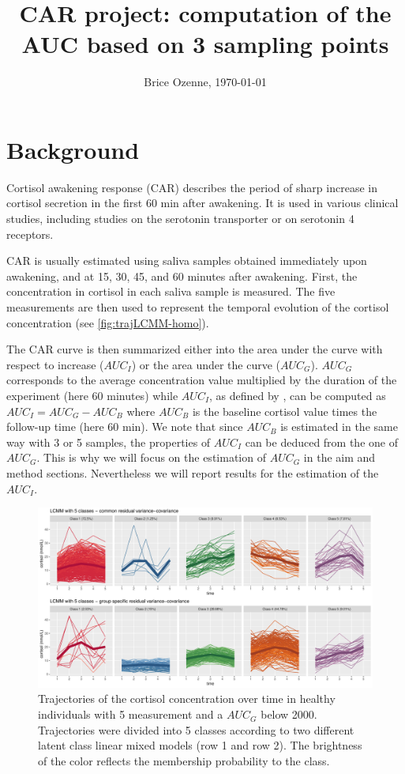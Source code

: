 \documentclass[12pt]{article}
\author{Brice Ozenne, \today}
\date{}
\title{CAR project: computation of the AUC based on 3 sampling points}
\begin{document}
\maketitle

\section{Background}
\label{sec:org199d56b}

Cortisol awakening response (CAR) describes the period of sharp
increase in cortisol secretion in the first 60 min after awakening. It
is used in various clinical studies, including studies on the
serotonin transporter or on serotonin 4 receptors.

\bigskip

CAR is usually estimated using saliva samples obtained immediately
upon awakening, and at 15, 30, 45, and 60 minutes after
awakening. First, the concentration in cortisol in each saliva sample
is measured. The five measurements are then used to represent the
temporal evolution of the cortisol concentration (see
\autoref{fig:trajLCMM-homo}).

\bigskip

The CAR curve is then summarized either into the area under the curve
with respect to increase (\(AUC_I\)) or the area under the curve
(\(AUC_G\)). \(AUC_G\) corresponds to the average concentration value
multiplied by the duration of the experiment (here 60 minutes) while
\(AUC_I\), as defined by \cite{fekedulegn2007area}, can be computed as
\(AUC_I = AUC_G - AUC_B\) where \(AUC_B\) is the baseline cortisol
value times the follow-up time (here 60 min). We note that since
\(AUC_B\) is estimated in the same way with 3 or 5 samples, the
properties of \(AUC_I\) can be deduced from the one of \(AUC_G\). This
is why we will focus on the estimation of \(AUC_G\) in the aim and
method sections. Nevertheless we will report results for the
estimation of the \(AUC_I\).


\begin{figure}[!h]
\centering
\includegraphics[width=\textwidth]{./figures/trajLCMM-5groups.pdf}
\caption{\label{fig:trajLCMM-homo}Trajectories of the cortisol concentration over time in healthy individuals with 5 measurement and a \(AUC_G\) below 2000. Trajectories were divided into 5 classes according to two different latent class linear mixed models (row 1 and row 2). The brightness of the color reflects the membership probability to the class.}
\end{figure}
\end{document}
